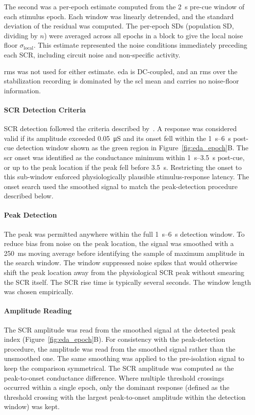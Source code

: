 The second was a per-epoch estimate computed from the \SI{2}{\second} pre-cue window of each stimulus epoch. Each window was linearly detrended, and the standard deviation of the residual was computed. The per-epoch SDs (population SD, dividing by $n$) were averaged across all epochs in a block to give the local noise floor $\sigma_\text{local}$. This estimate represented the noise conditions immediately preceding each SCR, including circuit noise and non-specific activity. 

\gls{rms} was not used for either estimate. \gls{eda} is DC-coupled, and an \gls{rms} over the stabilization recording is dominated by the \gls{scl} mean and carries no noise-floor information.

\paragraph{SCR Detection Criteria} 
SCR detection followed the criteria described by~\textcite{zangroniz_electrodermal_2017}. A response was considered valid if its amplitude exceeded \SI{0.05}{\micro\siemens} and its onset fell within the \SIrange{1}{6}{\second} post-cue detection window shown as the green region in Figure~\ref{fig:eda_epoch}B. The \gls{scr} onset was identified as the conductance minimum within \SIrange{1}{3.5}{\second} post-cue, or up to the peak location if the peak fell before \SI{3.5}{\second}. Restricting the onset to this sub-window enforced physiologically plausible stimulus-response latency. The onset search used the smoothed signal to match the peak-detection procedure described below.

\paragraph{Peak Detection} 
The peak was permitted anywhere within the full \SIrange{1}{6}{\second} detection window. To reduce bias from noise on the peak location, the signal was smoothed with a \SI{250}{\milli\second} moving average before identifying the sample of maximum amplitude in the search window. The window suppressed noise spikes that would otherwise shift the peak location away from the physiological SCR peak without smearing the SCR itself. The SCR rise time is typically several seconds. The window length was chosen empirically.

\paragraph{Amplitude Reading} 
The SCR amplitude was read from the smoothed signal at the detected peak index (Figure~\ref{fig:eda_epoch}B). For consistency with the peak-detection procedure, the amplitude was read from the smoothed signal rather than the unsmoothed one. The same smoothing was applied to the pre-isolation signal to keep the comparison symmetrical. The SCR amplitude was computed as the peak-to-onset conductance difference. Where multiple threshold crossings occurred within a single epoch, only the dominant response (defined as the threshold crossing with the largest peak-to-onset amplitude within the detection window) was kept.

